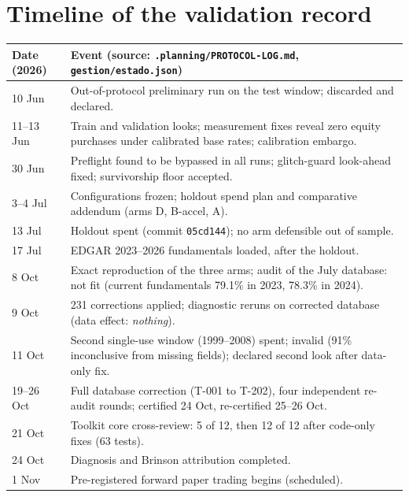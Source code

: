\documentclass[11pt]{article}
\begin{document}
\section{Timeline of the validation record}\label{app:timeline}
\small
\begin{tabularx}{\textwidth}{lX}
\toprule
Date (2026) & Event (source: \texttt{.planning/PROTOCOL-LOG.md}, \texttt{gestion/estado.json}) \\
\midrule
10 Jun & Out-of-protocol preliminary run on the test window; discarded and declared. \\
11--13 Jun & Train and validation looks; measurement fixes reveal zero equity purchases under calibrated base rates; calibration embargo. \\
30 Jun & Preflight found to be bypassed in all runs; glitch-guard look-ahead fixed; survivorship floor accepted. \\
3--4 Jul & Configurations frozen; holdout spend plan and comparative addendum (arms D, B-accel, A). \\
13 Jul & Holdout spent (commit \texttt{05cd144}); no arm defensible out of sample. \\
17 Jul & EDGAR 2023--2026 fundamentals loaded, after the holdout. \\
8 Oct & Exact reproduction of the three arms; audit of the July database: not fit (current fundamentals 79.1\% in 2023, 78.3\% in 2024). \\
9 Oct & 231 corrections applied; diagnostic reruns on corrected database (data effect: \emph{nothing}). \\
11 Oct & Second single-use window (1999--2008) spent; invalid (91\% inconclusive from missing fields); declared second look after data-only fix. \\
19--26 Oct & Full database correction (T-001 to T-202), four independent re-audit rounds; certified 24 Oct, re-certified 25--26 Oct. \\
21 Oct & Toolkit core cross-review: 5 of 12, then 12 of 12 after code-only fixes (63 tests). \\
24 Oct & Diagnosis and Brinson attribution completed. \\
1 Nov & Pre-registered forward paper trading begins (scheduled). \\
\bottomrule
\end{tabularx}
\end{document}
